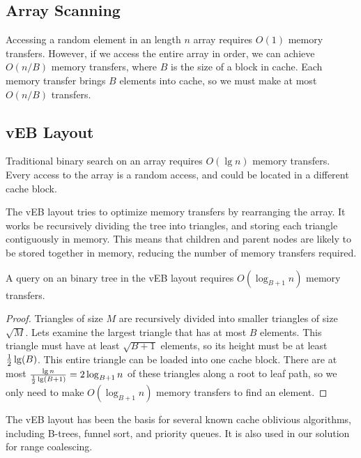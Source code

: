 \subsection*{Array Scanning}
Accessing a random element in an length $n$ array requires $O(1)$ memory
transfers. However, if we access the entire array in order, we can achieve
$O(n/B)$ memory transfers, where $B$ is the size of a block in cache. Each
memory transfer brings $B$ elements into cache, so we must make at most
$O(n/B)$ transfers.

\subsection*{vEB Layout} 
Traditional binary search on an array requires $O(\lg n)$ 
memory transfers. Every access to the array is a random access, and could
be located in a different cache block.

The vEB layout tries to optimize memory transfers by rearranging the array. It
works be recursively dividing the tree into triangles, and storing each
triangle contiguously in memory. This means that children and parent nodes are
likely to be stored together in memory, reducing the number of memory transfers
required.

\begin{lemma} 
A query on an binary tree in the vEB layout requires $O(\log_{B+1} n)$
memory transfers. 
\end{lemma}

\begin{proof} 
Triangles of size $M$ are recursively divided into smaller
triangles of size $\sqrt{M}$. Lets examine the largest triangle that has at most
$B$ elements. This triangle must have at least $\sqrt{B+1}$ elements, so its
height must be at least $\frac{1}{2}\lg \mathopen{}\left(B\right)\mathclose{}$. This entire triangle can be loaded
into one cache block. There are at most 
$\frac{\lg n}{\frac{1}{2}\lg \mathopen{}\left(B+1\right)\mathclose{}} = 2 \log_{B+1} n$ 
of these triangles along a root to leaf path, so we only need to make
$O(\log_{B+1} n)$ memory transfers to find an element. 
\end{proof}

The vEB layout has been the basis for several known cache oblivious algorithms, including 
B-trees, funnel sort, and priority queues. It is also used in our solution for range coalescing. 



